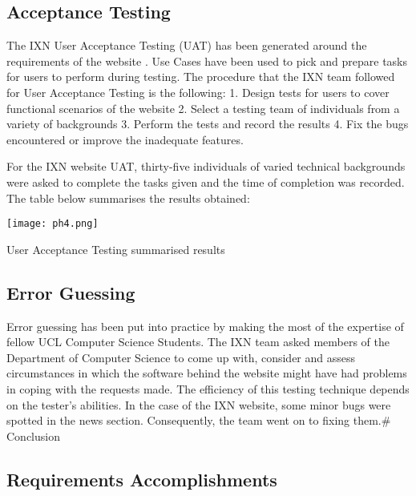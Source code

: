 \documentclass[fontsize=11pt]{extarticle}
\numberwithin{figure}{section} %
\begin{document}
\hypertarget{acceptance-testing}{%
\subsection{Acceptance Testing}\label{acceptance-testing}}

The IXN User Acceptance Testing (UAT) has been generated around the
requirements of the website \cite{g7} . Use Cases have been used to pick
and prepare tasks for users to perform during testing. The procedure
that the IXN team followed for User Acceptance Testing is the following:
1. Design tests for users to cover functional scenarios of the website
2. Select a testing team of individuals from a variety of backgrounds 3.
Perform the tests and record the results 4. Fix the bugs encountered or
improve the inadequate features.

For the IXN website UAT, thirty-five individuals of varied technical
backgrounds were asked to complete the tasks given and the time of
completion was recorded. The table below summarises the results
obtained:

\begin{table}[H]
      \centering
      \texttt{[image: ph4.png]}
      \caption{User Acceptance Testing summarised results}
 \end{table}

\hypertarget{error-guessing}{%
\subsection{Error Guessing}\label{error-guessing}}

Error guessing has been put into practice by making the most of the
expertise of fellow UCL Computer Science Students. The IXN team asked
members of the Department of Computer Science to come up with, consider
and assess circumstances in which the software behind the website might
have had problems in coping with the requests made. The efficiency of
this testing technique depends on the tester's abilities. In the case of
the IXN website, some minor bugs were spotted in the news section.
Consequently, the team went on to fixing them.\# Conclusion

\hypertarget{requirements-accomplishments}{%
\subsection{Requirements
Accomplishments}\label{requirements-accomplishments}}
\end{document}
